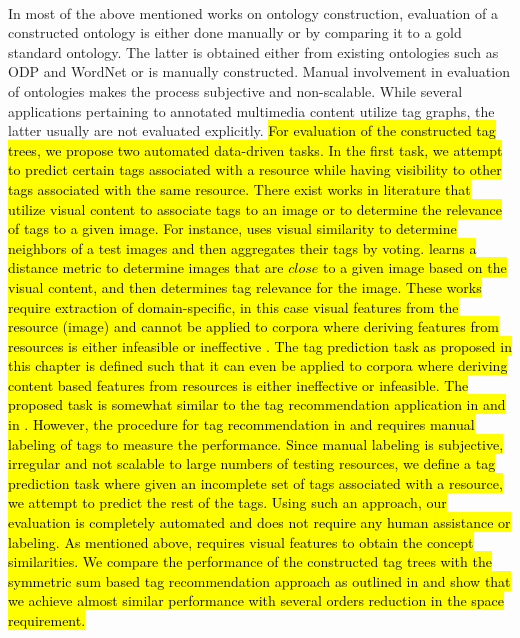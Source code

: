 {{{%
} \\
\indent In most of the above mentioned works on ontology construction, evaluation of a constructed ontology is either done manually or by comparing it to a gold standard ontology. The latter is obtained either from existing ontologies such as ODP and WordNet or is manually constructed. Manual involvement in evaluation of ontologies makes the process subjective and non-scalable. While several applications pertaining to annotated  multimedia content utilize tag graphs, the latter usually are not evaluated explicitly. \hl{For evaluation of the constructed tag trees, we propose two automated data-driven tasks. In the first task, we attempt to predict certain tags associated with a resource while having visibility to other tags associated with the same resource. There exist works in literature that utilize visual content to associate tags to an image or to determine the relevance of tags to a given image. For instance, {\cite{li2009learning}} uses visual similarity to determine neighbors of a test images and then aggregates their tags by voting. {\cite{wu2009distance}} learns a distance metric to determine images that are $close$ to a given image based on the visual content, and then determines tag relevance for the image. These works require extraction of domain-specific, in this case visual features from the resource (image) and cannot be applied to corpora where deriving features from resources is either infeasible or ineffective {\cite{huang2010text}\cite{song2010taxonomic}\cite{zanetti2008walk}\cite{yin2009exploring}}. The tag prediction task as proposed in this chapter is defined such that it can even be applied to corpora where deriving content based features from resources is either ineffective or infeasible.
The proposed task is somewhat similar to the tag recommendation application in  {\cite{katsurai2013cross}} and in {\cite{sigurbjornsson2008flickr}}. However, the procedure for tag recommendation in {\cite{katsurai2013cross}} and  {\cite{sigurbjornsson2008flickr}} requires manual labeling of tags to measure the performance. Since manual labeling is subjective, irregular and not scalable to large numbers of testing resources, we define a tag prediction task where given an incomplete set of tags associated with a resource, we attempt to predict the rest of the tags. Using such an approach, our evaluation is completely automated and does not require any human assistance or labeling. As mentioned above, {\cite{katsurai2013cross}} requires visual features to obtain the concept similarities. We compare the performance of the constructed tag trees with the symmetric sum based tag recommendation approach as outlined in {\cite{sigurbjornsson2008flickr}} and show that we achieve almost similar performance with several orders reduction in the space requirement.  \\
}}}
